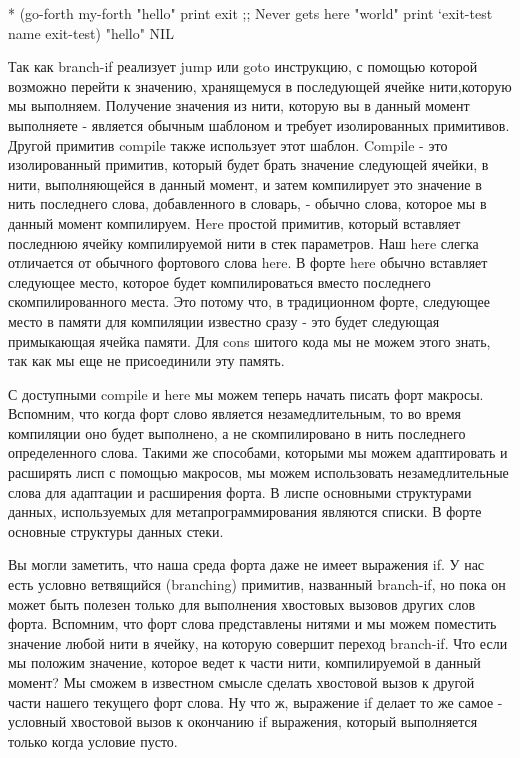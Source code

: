 {{{* (go-forth my-forth
{ "hello" print
exit
;; Never gets here
"world" print } ‘exit-test name
exit-test)
"hello"
NIL

Так как branch-if реализует jump или goto инструкцию, с помощью которой возможно перейти к значению, хранящемуся в последующей ячейке нити,которую мы выполняем. Получение значения из нити, которую вы в данный момент выполняете - является обычным шаблоном и требует изолированных примитивов. Другой примитив compile также использует этот шаблон. Compile - это изолированный примитив, который будет брать значение следующей ячейки, в нити, выполняющейся в данный момент, и затем компилирует это значение в нить последнего слова, добавленного в словарь, - обычно слова, которое мы в данный момент компилируем. Here простой примитив, который вставляет последнюю ячейку компилируемой нити в стек параметров. Наш here слегка отличается от обычного фортового слова here. В форте here обычно вставляет следующее место, которое будет компилироваться вместо последнего скомпилированного места. Это потому что, в традиционном форте, следующее место в памяти для компиляции известно сразу - это будет следующая примыкающая ячейка памяти. Для cons шитого кода мы не можем этого знать, так как мы еще не присоединили эту память.

С доступными compile и here мы можем теперь начать писать форт макросы. Вспомним, что когда форт слово является незамедлительным, то во время компиляции оно будет выполнено, а не скомпилировано в нить последнего определенного слова. Такими же способами, которыми мы можем адаптировать и расширять лисп с помощью макросов, мы можем использовать незамедлительные слова для адаптации и расширения форта. В лиспе основными структурами данных, используемых для метапрограммирования являются списки. В форте основные структуры данных стеки.

Вы могли заметить, что наша среда форта даже не имеет выражения if. У нас есть условно ветвящийся (branching) примитив, названный branch-if, но пока он может быть полезен только для выполнения хвостовых вызовов других слов форта. Вспомним, что форт слова представлены нитями и мы можем поместить значение любой нити в ячейку, на которую совершит переход branch-if. Что если мы положим значение, которое ведет к части нити, компилируемой в данный момент? Мы сможем в известном смысле сделать хвостовой вызов к другой части нашего текущего форт слова. Ну что ж, выражение if делает то же самое - условный хвостовой вызов к окончанию if выражения, который выполняется только когда условие пусто.

}}}
